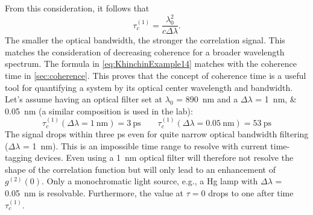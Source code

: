 From this consideration, it follows that
\begin{equation}\label{eq:KhinchinExample14}
	\tau_c^{(1)}=\dfrac{\lambda^2_0}{c\Delta\lambda}.
\end{equation}
The smaller the optical bandwidth, the stronger the correlation signal. This matches the consideration of
decreasing coherence for a broader wavelength spectrum. The formula in \cref{eq:KhinchinExample14} matches with the coherence time in \cref{sec:coherence}. This proves that the concept of coherence time is a useful tool for quantifying a system by its optical center wavelength and bandwidth.
Let’s assume having an optical filter set at $\lambda_0$ = \SI{890}{\nm} and a $\Delta\lambda$ = \SIlist[list-units = brackets]{1;0.05}{\nm} (a similar composition is used in the lab):
\begin{equation}\label{eq:KhinchinExample5}
	\tau_c^{(1)}(\Delta\lambda=\SI{1}{\nm})=\SI{3}{\ps}\qquad\tau_c^{(1)}(\Delta\lambda=\SI{0.05}{\nm})=\SI{53}{\ps}
\end{equation}
The signal drops within three \si{\ps} even for quite narrow optical bandwidth filtering ($\Delta\lambda$ = \SI{1}{\nm}). This is an impossible time range to resolve with current time-tagging devices. Even using a \SI{1}{\nm} optical filter will therefore not resolve the shape of the correlation function but will only lead to an enhancement of $g^{(2)}(0)$. Only a monochromatic light source, e.g., a Hg lamp with $\Delta\lambda$ = \SI{0.05}{\nm} is resolvable. Furthermore, the value at $\tau=0$ drops to one after time $\tau_c^{(1)}$.

